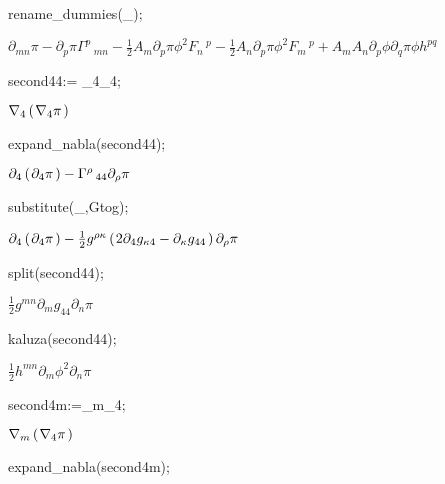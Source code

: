 \documentclass[10pt]{article}
\newcommand\brwrap[3]{%
  \setbox0=\hbox{$#2$}
  \left#1\vbox to \the\ht0{\hbox to 0pt{}}\right.\kern-.2em
  \begingroup #2\endgroup\kern-.15em
  \left.\vbox to \the\ht0{\hbox to 0pt{}}\right#3
}
\begin{document}
\begin{python}
rename_dummies(_);
\end{python}
\begin{adjustwidth}{1em}{0cm}${}\partial_{m n}{\pi}-\partial_{p}{\pi} \Gamma^{p}\,_{m n} - \frac{1}{2}A_{m} \partial_{p}{\pi} {\phi}^{2} F_{n}\,^{p} - \frac{1}{2}A_{n} \partial_{p}{\pi} {\phi}^{2} F_{m}\,^{p}+A_{m} A_{n} \partial_{p}{\phi} \partial_{q}{\pi} \phi h^{p q}$\end{adjustwidth}
\begin{python}
second44:= \nabla_{4}{\nabla_{4}{\pi}};
\end{python}
\begin{adjustwidth}{1em}{0cm}${}\nabla_{4}\brwrap{(}{\nabla_{4}{\pi}}{)}$\end{adjustwidth}
\begin{python}
expand_nabla(second44);
\end{python}
\begin{adjustwidth}{1em}{0cm}${}\partial_{4}\brwrap{(}{\partial_{4}{\pi}}{)}-\Gamma^{\rho}\,_{4 4} \partial_{\rho}{\pi}$\end{adjustwidth}
\begin{python}
substitute(_,Gtog);
\end{python}
\begin{adjustwidth}{1em}{0cm}${}\partial_{4}\brwrap{(}{\partial_{4}{\pi}}{)} - \frac{1}{2}g^{\rho \kappa} \brwrap{(}{2\partial_{4}{g_{\kappa 4}}-\partial_{\kappa}{g_{4 4}}}{)} \partial_{\rho}{\pi}$\end{adjustwidth}
\begin{python}
split(second44);
\end{python}
\begin{adjustwidth}{1em}{0cm}${}\frac{1}{2}g^{m n} \partial_{m}{g_{4 4}} \partial_{n}{\pi}$\end{adjustwidth}
\begin{python}
kaluza(second44);
\end{python}
\begin{adjustwidth}{1em}{0cm}${}\frac{1}{2}h^{m n} \partial_{m}{{\phi}^{2}} \partial_{n}{\pi}$\end{adjustwidth}
\begin{python}
second4m:=\nabla_{m}{\nabla_{4}{\pi}};
\end{python}
\begin{adjustwidth}{1em}{0cm}${}\nabla_{m}\brwrap{(}{\nabla_{4}{\pi}}{)}$\end{adjustwidth}
\begin{python}
expand_nabla(second4m);
\end{python}
\end{document}
